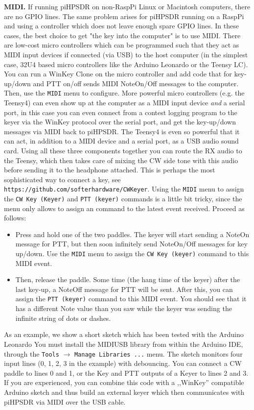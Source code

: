 \documentclass[12pt]{book}
\def\bltt#1{\texttt{\color{blue}#1}}
\def\pH{pi\-HPSDR\xspace}
\begin{document}
\textbf{MIDI.}
If running \pH on non-RaspPi Linux or Macintosh computers, there are no GPIO
lines. The same problem arises for \pH running on a RaspPi and using a controller
which does not leave enough spare GPIO lines. In these cases, the best
choice to get "the key into the computer" is to use MIDI. There are low-cost
micro controllers which can be programmed such that they act as MIDI input devices
if connected (via USB) to the host computer (in the simplest case, 32U4 based
micro controllers like the Arduino Leonardo or the Teensy LC). You can
run a WinKey Clone on the micro controller and add code that for key-up/down and
PTT on/off sends MIDI NoteOn/Off messages to the computer. Then, use the
\bltt{MIDI} menu to configure. More powerful micro controllers (e.g. the Teensy4)
can even show up at the computer as a MIDI input device \textit{and} a serial port,
in this case you can even connect from a contest logging program to  the keyer
via the WinKey protocol over the serial port, and get the key-up/down messages
via MIDI back to \pH. The Teensy4 is even so powerful that it can act, in
addition to a MIDI device and a serial port, as a USB audio sound card.
Using all these three components together you can route the RX audio to the
Teensy, which then takes care of mixing the CW side tone with this audio
before sending it to the headphone attached. This is perhaps the most
sophisticated way to connect a key, see \texttt{https://github.com/softerhardware/CWKeyer}.
Using the \bltt{MIDI} menu to assign the \bltt{CW Key (Keyer)} and \bltt{PTT (keyer)}
commands is a little bit tricky, since the menu only allows to assign an command to
the latest event received. Proceed as follows:

\begin{itemize}
\item{Press and hold one of the two paddles. The keyer will start sending a NoteOn
message for PTT, but then soon infinitely send NoteOn/Off messages for key up/down.
Use the \bltt{MIDI} menu to assign the \bltt{CW Key (keyer)} command to this MIDI event.}
\item{Then, release the paddle. Some time (the hang time of the keyer) after the last
key-up, a NoteOff message for PTT will be sent. After this, you can assign the
\bltt{PTT (keyer)} command to this MIDI event. You should see that it has a different
Note value than you saw while the keyer was sending the infinite string of dots or
dashes.}
\end{itemize}

As an example, we show a short sketch which has been tested with the Arduino Leonardo
You must install the MIDIUSB library from within the Arduino IDE, through the
\texttt{Tools} $\to$ \texttt{Manage Libraries ...}  menu. The sketch monitors four
input lines (0, 1, 2, 3 in the example) with debouncing. You can connect a CW paddle
to lines 0 and 1, or the Key and PTT outputs of a Keyer to lines 2 and 3.
If you are experienced, you can combine this code with a ,,WinKey'' compatible
Arduino sketch and thus build an external keyer which then communicates with \pH
via MIDI over the USB cable.
\end{document}
